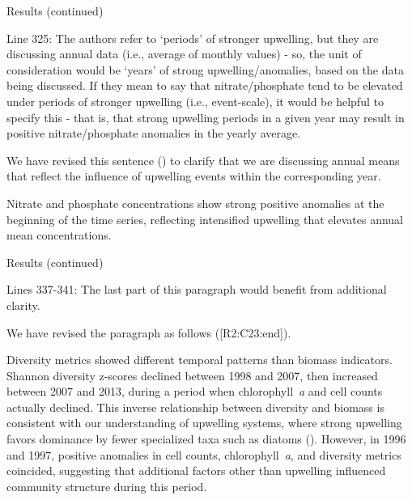 \documentclass[12pt,english]{reviewresponse}
\begin{document}
\begin{revcomment}
	Results (continued)

    Line 325: The authors refer to ‘periods’ of stronger upwelling, but they are discussing annual data (i.e., average of monthly values) - so, the unit of consideration would be ‘years’ of strong upwelling/anomalies, based on the data being discussed. If they mean to say that nitrate/phosphate tend to be elevated under periods of stronger upwelling (i.e., event-scale), it would be helpful to specify this - that is, that strong upwelling periods in a given year may result in positive nitrate/phosphate anomalies in the yearly average.
\end{revcomment}
\begin{revresponse}
    We have revised this sentence () to clarify that we are discussing annual means that reflect the influence of upwelling events within the corresponding year.
    \begin{changes}
        Nitrate and phosphate concentrations show strong positive anomalies at the beginning of the time series, reflecting intensified upwelling that elevates annual mean concentrations.
    \end{changes}
\end{revresponse}

\begin{revcomment}
	Results (continued)

    Lines 337-341: The last part of this paragraph would benefit from additional clarity.
\end{revcomment}
\begin{revresponse}
    We have revised the paragraph as follows ([R2:C23:end]).
    \begin{changes}
        Diversity metrics showed different temporal patterns than biomass indicators. Shannon diversity z-scores declined between 1998 and 2007, then increased between 2007 and 2013, during a period when chlorophyll~\textit{a} and cell counts actually declined. This inverse relationship between diversity and biomass is consistent with our understanding of upwelling systems, where strong upwelling favors dominance by fewer specialized taxa such as diatoms (\cite{james_influence_2022}). However, in 1996 and 1997, positive anomalies in cell counts, chlorophyll~\textit{a}, and diversity metrics coincided, suggesting that additional factors other than upwelling influenced community structure during this period. 
    \end{changes}
\end{revresponse}
\end{document}
